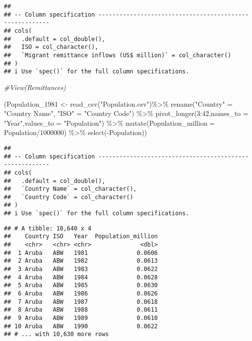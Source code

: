 \documentclass[
]{article}
\newenvironment{Shaded}{\begin{snugshade}}{\end{snugshade}}
\newcommand{\AttributeTok}[1]{\textcolor[rgb]{0.77,0.63,0.00}{#1}}
\newcommand{\CommentTok}[1]{\textcolor[rgb]{0.56,0.35,0.01}{\textit{#1}}}
\newcommand{\DecValTok}[1]{\textcolor[rgb]{0.00,0.00,0.81}{#1}}
\newcommand{\FunctionTok}[1]{\textcolor[rgb]{0.00,0.00,0.00}{#1}}
\newcommand{\NormalTok}[1]{#1}
\newcommand{\OtherTok}[1]{\textcolor[rgb]{0.56,0.35,0.01}{#1}}
\newcommand{\SpecialCharTok}[1]{\textcolor[rgb]{0.00,0.00,0.00}{#1}}
\newcommand{\StringTok}[1]{\textcolor[rgb]{0.31,0.60,0.02}{#1}}
\begin{document}
\begin{verbatim}
## 
## -- Column specification --------------------------------------------------------
## cols(
##   .default = col_double(),
##   ISO = col_character(),
##   `Migrant remittance inflows (US$ million)` = col_character()
## )
## i Use `spec()` for the full column specifications.
\end{verbatim}

\begin{Shaded}
\begin{Highlighting}[]
\CommentTok{\#View(Remittances)}

\NormalTok{(Population\_1981 }\OtherTok{\textless{}{-}} \FunctionTok{read\_csv}\NormalTok{(}\StringTok{"Population.csv"}\NormalTok{)}\SpecialCharTok{\%\textgreater{}\%}
  \FunctionTok{rename}\NormalTok{(}\StringTok{"Country"} \OtherTok{=} \StringTok{"Country Name"}\NormalTok{, }\StringTok{"ISO"} \OtherTok{=} \StringTok{"Country Code"}\NormalTok{) }\SpecialCharTok{\%\textgreater{}\%}
  \FunctionTok{pivot\_longer}\NormalTok{(}\DecValTok{3}\SpecialCharTok{:}\DecValTok{42}\NormalTok{,}\AttributeTok{names\_to =} \StringTok{"Year"}\NormalTok{,}\AttributeTok{values\_to =} \StringTok{"Population"}\NormalTok{) }\SpecialCharTok{\%\textgreater{}\%}
  \FunctionTok{mutate}\NormalTok{(}\AttributeTok{Population\_million =}\NormalTok{ Population}\SpecialCharTok{/}\DecValTok{1000000}\NormalTok{) }\SpecialCharTok{\%\textgreater{}\%}
  \FunctionTok{select}\NormalTok{(}\SpecialCharTok{{-}}\NormalTok{Population))}
\end{Highlighting}
\end{Shaded}

\begin{verbatim}
## 
## -- Column specification --------------------------------------------------------
## cols(
##   .default = col_double(),
##   `Country Name` = col_character(),
##   `Country Code` = col_character()
## )
## i Use `spec()` for the full column specifications.
\end{verbatim}

\begin{verbatim}
## # A tibble: 10,640 x 4
##    Country ISO   Year  Population_million
##    <chr>   <chr> <chr>              <dbl>
##  1 Aruba   ABW   1981              0.0606
##  2 Aruba   ABW   1982              0.0613
##  3 Aruba   ABW   1983              0.0622
##  4 Aruba   ABW   1984              0.0628
##  5 Aruba   ABW   1985              0.0630
##  6 Aruba   ABW   1986              0.0626
##  7 Aruba   ABW   1987              0.0618
##  8 Aruba   ABW   1988              0.0611
##  9 Aruba   ABW   1989              0.0610
## 10 Aruba   ABW   1990              0.0622
## # ... with 10,630 more rows
\end{verbatim}
\end{document}
